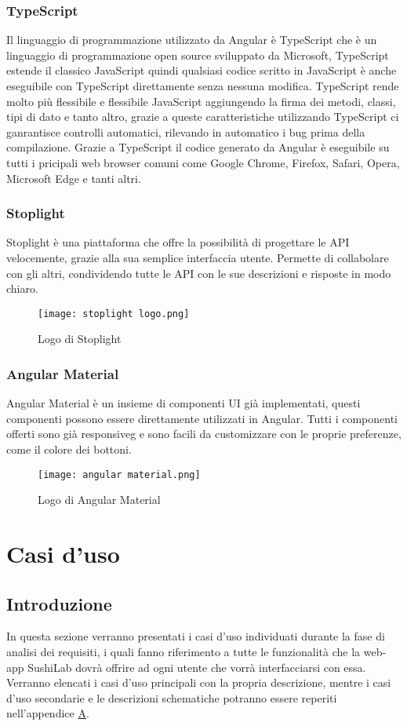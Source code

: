 \subsubsection{TypeScript}
Il linguaggio di programmazione utilizzato da Angular è TypeScript che è un linguaggio di programmazione open source sviluppato da Microsoft, TypeScript estende il classico JavaScript quindi qualsiasi codice scritto in JavaScript è anche eseguibile con TypeScript direttamente senza nessuna modifica. TypeScript rende molto più flessibile e flessibile JavaScript aggiungendo la firma dei metodi, classi, tipi di dato e tanto altro, grazie a queste caratteristiche utilizzando TypeScript ci ganrantisce controlli automatici, rilevando in automatico i bug prima della compilazione. Grazie a TypeScript il codice generato da Angular è eseguibile su tutti i pricipali web browser comuni come Google Chrome, Firefox, Safari, Opera, Microsoft Edge e tanti altri.
\subsubsection{Stoplight}
Stoplight è una piattaforma che offre la possibilità di progettare le API velocemente, grazie alla sua semplice interfaccia utente. Permette di collabolare con gli altri, condividendo tutte le API con le sue descrizioni e risposte in modo chiaro.
\begin{figure}[H]
    \centering
    \texttt{[image: stoplight logo.png]}
    \caption{Logo di Stoplight}
\end{figure}
\subsubsection{Angular Material}
Angular Material è un insieme di componenti UI già implementati, questi componenti possono essere direttamente utilizzati in Angular. Tutti i componenti offerti sono già \gls{responsiveg} e sono facili da customizzare con le proprie preferenze, come il colore dei bottoni.
\begin{figure}[H]
    \centering
    \texttt{[image: angular material.png]}
    \caption{Logo di Angular Material}
\end{figure}
\section{Casi d'uso}
\subsection{Introduzione}
In questa sezione verranno presentati i casi d'uso individuati durante la fase di analisi dei requisiti, i quali fanno riferimento a tutte le funzionalità che la web-app SushiLab dovrà offrire ad ogni utente che vorrà interfacciarsi con essa. Verranno elencati i casi d'uso principali con la propria descrizione, mentre i casi d'uso secondarie e le descrizioni schematiche potranno essere reperiti nell'appendice {\hyperref[cap:appendice a]{A}}.

